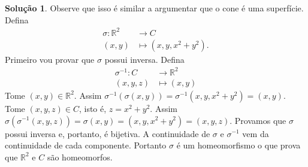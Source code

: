 \documentclass[a4paper,12pt]{article}
\newcommand{\R}{\mathbb{R}}
\theoremstyle{exer}
\theoremstyle{definition}
\newtheorem{solution}{Solução}
\theoremstyle{plain}
\begin{document}
\begin{solution}
    Observe que isso é similar a argumentar que o cone é uma superfície.
    Defina 
    \begin{align*}
        \sigma : \R^2 &\to C \\
        (x,y) &\mapsto (x,y,x^2+y^2).
    \end{align*}
    Primeiro vou provar que $\sigma$ possui inversa. Defina
    \begin{align*}
        \sigma^{-1} : C &\to \R^2 \\
        (x,y,z) &\mapsto (x,y)
    \end{align*}
    Tome $(x,y) \in \R^2$. Assim $\sigma^{-1}(\sigma(x,y)) =
    \sigma^{-1}(x,y,x^2+y^2)=(x,y)$. Tome $(x,y,z) \in C$, isto é, $z = x^2 +
    y^2$. Assim $\sigma(\sigma^{-1}(x,y,z)) = \sigma(x,y) = (x,y,x^2+y^2)=
    (x,y,z)$.  Provamos que $\sigma$ possui inversa e, portanto, é bijetiva. A
    continuidade de $\sigma$ e $\sigma^{-1}$ vem da continuidade de cada
    componente. Portanto $\sigma$ é um homeomorfismo o que prova que $\R^2$ e
    $C$ são homeomorfos.
\end{solution}

\end{document}
